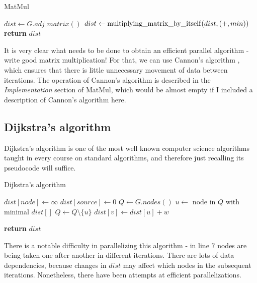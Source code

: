 \documentclass[12pt,a4paper,twoside,openright]{report}
\begin{document}
\begin{algorithm}
\caption{MatMul}\label{matmul}
\begin{algorithmic}[1]
\State $\textit{dist} \gets G.adj\_matrix()$
        \State $dist \gets {\rm multiplying\_matrix\_by\_itself}(dist,(+,min))$
      \EndFor
\State \textbf{return} $dist$
\EndProcedure
\end{algorithmic}
\end{algorithm}

It is very clear what needs to be done to obtain an efficient parallel algorithm - write good matrix multiplication! For that, we can use Cannon's algorithm \cite{cannon}, which ensures that there is little unnecessary movement of data between iterations. The operation of Cannon's algorithm is described in the \textit{Implementation} section of MatMul, which would be almost empty if I included a description of Cannon's algorithm here. 

\subsection{Dijkstra's algorithm}
Dijkstra's algorithm is one of the most well known computer science algorithms taught in every course on standard algorithms, and therefore just recalling its pseudocode will suffice.

\begin{algorithm}
\caption{Dijkstra's algorithm}\label{dijkstra}
\begin{algorithmic}[1]
    \State $dist[node] \gets \infty$
\EndFor
\State $dist[source] \gets 0$
\State $Q \gets G.nodes()$
        \State $u \gets$ node in $Q$ with minimal $dist[]$
        \State $Q \gets Q \setminus \{u\}$
            \State $dist[v] \gets dist[u] + w$
        \EndIf
      \EndFor
    \EndWhile
    
    
\State \textbf{return} $dist$
\EndProcedure
\end{algorithmic}
\end{algorithm}

There is a notable difficulty in parallelizing this algorithm - in line $7$ nodes are being taken one after another in different iterations. There are lots of data dependencies, because changes in $dist$ may affect which nodes in the subsequent iterations. Nonetheless, there have been attempts at efficient parallelizations.
\end{document}

